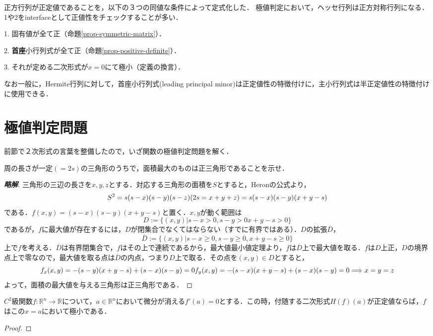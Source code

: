 \documentclass[uplatex, dvipdfmx]{jsreport}
\begin{document}
\begin{screen}
    正方行列が正定値であることを，以下の３つの同値な条件によって定式化した．
    極値判定において，ヘッセ行列は正方対称行列になる．1や2をinterfaceとして正値性をチェックすることが多い．

    1. 固有値が全て正（命題\ref{prop-symmetric-matrix}）．

    2. \textbf{首座}小行列式が全て正（命題\ref{prop-positive-definite}）．

    3. それが定める二次形式が$x=0$にて極小（定義の換言）．
\end{screen}
なお一般に，Hermite行列に対して，首座小行列式(leading principal minor)は正定値性の特徴付けに，主小行列式は半正定値性の特徴付けに使用できる．

\section{極値判定問題}
前節で２次形式の言葉を整備したので，いざ関数の極値判定問題を解く．

\begin{reidai}
    周の長さが一定$(=2s)$の三角形のうちで，面積最大のものは正三角形であることを示せ．
\end{reidai}
\begin{proof}[\bf{略解}]
    三角形の三辺の長さを$x,y,z$とする．対応する三角形の面積を$S$とすると，Heronの公式より，$$S^2=s(s-x)(s-y)(s-z) (2s=x+y+z) \\ =s(s-x)(s-y)(x+y-s)$$である．$f(x,y)=(s-x)(s-y)(x+y-s)$と置く．$x,y$が動く範囲は$$D:=\{ (x,y)|s-x>0, s-y>0 x+y-s>0 \}$$であるが，$f$に最大値が存在するには，$D$が閉集合でなくてはならない（すでに有界ではある）．$D$の拡張$\overline{D}$，$$\overline{D} := \{ (x,y)|s-x \ge 0, s-y \ge 0, x+y-s \ge 0 \}$$上で$f$を考える．$\overline{D}$は有界閉集合で，$f$はその上で連続であるから，最大値最小値定理より，$f$は$\overline{D}$上で最大値を取る．$f$は$D$上正，$D$の境界点上で零なので，最大値を取る点は$\overline{D}$の内点，つまり$D$上で取る．その点を$(x,y)\in D$とすると，$$f_x(x,y)=-(s-y)(x+y-s)+(s-x)(s-y)=0\\f_y(x,y)=-(s-x)(x+y-s)+(s-x)(s-y)=0\\ \Longrightarrow x=y=z$$よって，面積の最大値を与える三角形は正三角形である．
\end{proof}

\begin{shadebox}\begin{proposition}[正値ならば極小]
    $C^2$級関数$f:\mathbb{R}^n\to\mathbb{R}$について，$a\in\mathbb{R}^n$において微分が消える$f'(a)=0$とする．この時，付随する二次形式$H(f)(a)$が正定値ならば，$f$はこの$x=a$において極小である．
\end{proposition}\end{shadebox}
\begin{proof}
    
\end{proof}
\end{document}
